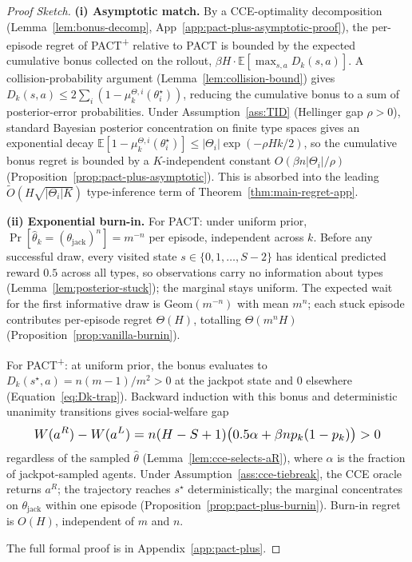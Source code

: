 \begin{proof}[Proof Sketch]
\textbf{(i) Asymptotic match.} By a CCE-optimality decomposition (Lemma~\ref{lem:bonus-decomp}, App~\ref{app:pact-plus-asymptotic-proof}), the per-episode regret of PACT\textsuperscript{+} relative to PACT is bounded by the expected cumulative bonus collected on the rollout, $\beta H \cdot \mathbb{E}[\max_{s,a} D_k(s, a)]$. A collision-probability argument (Lemma~\ref{lem:collision-bound}) gives $D_k(s, a) \leq 2 \sum_i (1 - \mu_k^{\Theta, i}(\theta_i^\star))$, reducing the cumulative bonus to a sum of posterior-error probabilities. Under Assumption~\ref{ass:TID} (Hellinger gap $\rho > 0$), standard Bayesian posterior concentration on finite type spaces \citep{ghosal2007convergence} gives an exponential decay $\mathbb{E}[1 - \mu_k^{\Theta, i}(\theta_i^\star)] \leq |\Theta_i| \exp(-\rho H k / 2)$, so the cumulative bonus regret is bounded by a $K$-independent constant $O(\beta n |\Theta_i| / \rho)$ (Proposition~\ref{prop:pact-plus-asymptotic}). This is absorbed into the leading $\tilde O(H\sqrt{|\Theta_i| K})$ type-inference term of Theorem~\ref{thm:main-regret-app}.

\textbf{(ii) Exponential burn-in.} For PACT: under uniform prior, $\Pr[\hat\theta_k = (\theta_{\mathrm{jack}})^n] = m^{-n}$ per episode, independent across $k$. Before any successful draw, every visited state $s \in \{0, 1, \ldots, S-2\}$ has identical predicted reward $0.5$ across all types, so observations carry no information about types (Lemma~\ref{lem:posterior-stuck}); the marginal stays uniform. The expected wait for the first informative draw is $\mathrm{Geom}(m^{-n})$ with mean $m^n$; each stuck episode contributes per-episode regret $\Theta(H)$, totalling $\Theta(m^n H)$ (Proposition~\ref{prop:vanilla-burnin}).

For PACT\textsuperscript{+}: at uniform prior, the bonus evaluates to $D_k(s^\star, a) = n(m-1)/m^2 > 0$ at the jackpot state and $0$ elsewhere (Equation~\ref{eq:Dk-trap}). Backward induction with this bonus and deterministic unanimity transitions gives social-welfare gap
\begin{equation*}\resizebox{0.9\linewidth}{!}{$\displaystyle W(a^R) - W(a^L) = n(H - S + 1)\big(0.5\alpha + \beta n p_k(1-p_k)\big) > 0 $}\end{equation*}
regardless of the sampled $\hat\theta$ (Lemma~\ref{lem:cce-selects-aR}), where $\alpha$ is the fraction of jackpot-sampled agents. Under Assumption~\ref{ass:cce-tiebreak}, the CCE oracle returns $a^R$; the trajectory reaches $s^\star$ deterministically; the marginal concentrates on $\theta_{\mathrm{jack}}$ within one episode (Proposition~\ref{prop:pact-plus-burnin}). Burn-in regret is $O(H)$, independent of $m$ and $n$.

The full formal proof is in Appendix~\ref{app:pact-plus}.
\end{proof}

